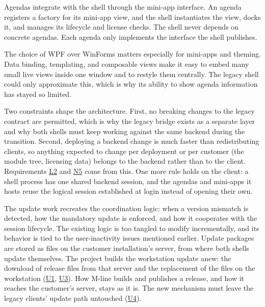 \documentclass{article}
\newcommand{\req}[1]{\hyperlink{req:#1}{#1}}
\begin{document}
Agendas integrate with the shell through the mini-app interface. An agenda registers a factory for its mini-app view, and the shell instantiates the view, docks it, and manages its lifecycle and license checks. The shell never depends on concrete agendas. Each agenda only implements the interface the shell publishes.

The choice of WPF over WinForms matters especially for mini-apps and theming. Data binding, templating, and composable views make it easy to embed many small live views inside one window and to restyle them centrally. The legacy shell could only approximate this, which is why its ability to show agenda information has stayed so limited.

Two constraints shape the architecture. First, no breaking changes to the legacy contract are permitted, which is why the legacy bridge exists as a separate layer and why both shells must keep working against the same backend during the transition. Second, deploying a backend change is much faster than redistributing clients, so anything expected to change per deployment or per customer (the module tree, licensing data) belongs to the backend rather than to the client. Requirements \req{L2} and \req{N5} come from this. One more rule holds on the client: a shell process has one shared backend session, and the agendas and mini-apps it hosts reuse the logical session established at login instead of opening their own.

The update work recreates the coordination logic: when a version mismatch is detected, how the mandatory update is enforced, and how it cooperates with the session lifecycle. The existing logic is too tangled to modify incrementally, and its behavior is tied to the user-inactivity issues mentioned earlier. Update packages are stored as files on the customer installation's server, from where both shells update themselves. The project builds the workstation update anew: the download of release files from that server and the replacement of the files on the workstation (\req{U1}, \req{U3}). How M-line builds and publishes a release, and how it reaches the customer's server, stays as it is. The new mechanism must leave the legacy clients' update path untouched (\req{U4}).
\end{document}
